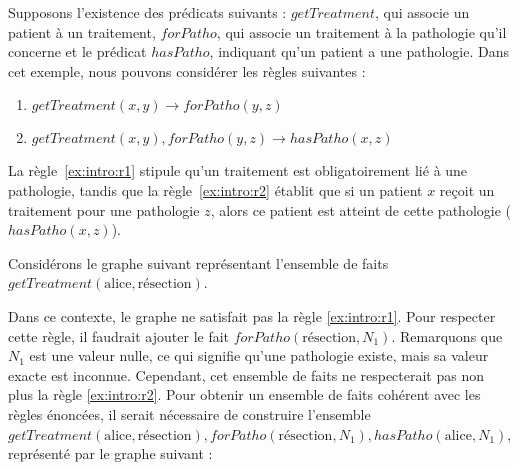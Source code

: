 \begin{example}
    Supposons l'existence des prédicats suivants : $getTreatment$, qui associe un patient à un traitement, $forPatho$, qui associe un traitement à la pathologie qu'il concerne et le prédicat $hasPatho$, indiquant qu'un patient a une pathologie.
    Dans cet exemple, nous pouvons considérer les règles suivantes :
    \begin{enumerate}[label=\textbf{$r_\arabic*$ :},ref=$r_\arabic*$]
        \item $getTreatment(x, y) \to forPatho(y, z)$ \label{ex:intro:r1}
        \item $getTreatment(x, y), forPatho(y, z) \to hasPatho(x, z)$ \label{ex:intro:r2}
    \end{enumerate}
    La règle~\ref{ex:intro:r1} stipule qu'un traitement est obligatoirement lié à une pathologie, tandis que la règle~\ref{ex:intro:r2} établit que si un patient $x$ reçoit un traitement pour une pathologie $z$, alors ce patient est atteint de cette pathologie ($hasPatho(x, z)$).
    
    Considérons le graphe suivant représentant l'ensemble de faits ${getTreatment(\text{alice}, \text{résection})}$.
    \begin{center}
        \begin{adjustbox}{max width=\linewidth}
        \end{adjustbox}
    \end{center}

    Dans ce contexte, le graphe ne satisfait pas la règle \ref{ex:intro:r1}.
    Pour respecter cette règle, il faudrait ajouter le fait $forPatho(\text{résection}, N_1)$.
    Remarquons que $N_1$ est une valeur nulle, ce qui signifie qu'une pathologie existe, mais sa valeur exacte est inconnue.
    Cependant, cet ensemble de faits ne respecterait pas non plus la règle \ref{ex:intro:r2}.
    Pour obtenir un ensemble de faits cohérent avec les règles énoncées, il serait nécessaire de construire l'ensemble ${getTreatment(\text{alice}, \text{résection}), forPatho(\text{résection}, N_1), hasPatho(\text{alice}, N_1)}$, représenté par le graphe suivant :
    \begin{center}
        \begin{adjustbox}{max width=\linewidth}
\end{adjustbox}
\end{center}
\end{example}
